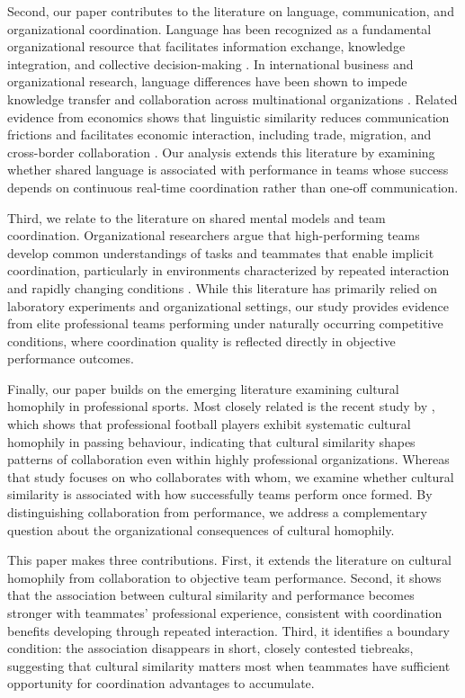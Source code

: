 \documentclass[10pt]{article}
\begin{document}
Second, our paper contributes to the literature on language, communication, and organizational coordination. Language has been recognized as a fundamental organizational resource that facilitates information exchange, knowledge integration, and collective decision-making \citep{wernerfelt2004}. In international business and organizational research, language differences have been shown to impede knowledge transfer and collaboration across multinational organizations \citep{marschanpiekkari1999,feelyharzing2003}. Related evidence from economics shows that linguistic similarity reduces communication frictions and facilitates economic interaction, including trade, migration, and cross-border collaboration \citep[e.g.,][]{melitztoubal2014}. Our analysis extends this literature by examining whether shared language is associated with performance in teams whose success depends on continuous real-time coordination rather than one-off communication.

Third, we relate to the literature on shared mental models and team coordination. Organizational researchers argue that high-performing teams develop common understandings of tasks and teammates that enable implicit coordination, particularly in environments characterized by repeated interaction and rapidly changing conditions \citep{cannonbowers1993,klimoski1994,mathieu2000}. While this literature has primarily relied on laboratory experiments and organizational settings, our study provides evidence from elite professional teams performing under naturally occurring competitive conditions, where coordination quality is reflected directly in objective performance outcomes.

Finally, our paper builds on the emerging literature examining cultural homophily in professional sports. Most closely related is the recent study by \citet{bekesottaviano2025}, which shows that professional football players exhibit systematic cultural homophily in passing behaviour, indicating that cultural similarity shapes patterns of collaboration even within highly professional organizations. Whereas that study focuses on who collaborates with whom, we examine whether cultural similarity is associated with how successfully teams perform once formed. By distinguishing collaboration from performance, we address a complementary question about the organizational consequences of cultural homophily.

This paper makes three contributions. First, it extends the literature on cultural homophily from collaboration to objective team performance. Second, it shows that the association between cultural similarity and performance becomes stronger with teammates' professional experience, consistent with coordination benefits developing through repeated interaction. Third, it identifies a boundary condition: the association disappears in short, closely contested tiebreaks, suggesting that cultural similarity matters most when teammates have sufficient opportunity for coordination advantages to accumulate.
\end{document}

